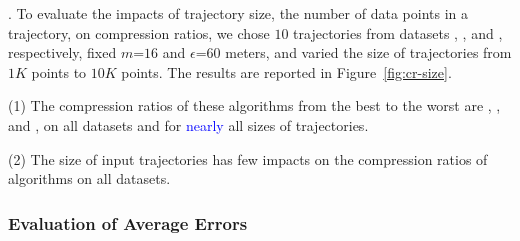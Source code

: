 .
To evaluate the impacts of trajectory size, \ie the number of data points in a trajectory, on compression ratios,
we chose {$10$} trajectories from {datasets \sercar, \geolife, \mopsi and \pricar}, respectively,
fixed {$m$=$16$} and $\epsilon$=$60$ meters, and varied the size  of trajectories from $1K$ points to $10K$ points.
%
The results are reported in Figure~\ref{fig:cr-size}.

\ni(1) The compression ratios of these algorithms from the best to the worst are \cista, \dps, \cist and \squishe, on all datasets and for \textcolor{blue}{nearly} all sizes of trajectories. %

\ni(2) The size of input trajectories has few impacts on the compression ratios of \lsa algorithms on all datasets.





\subsubsection{Evaluation of Average Errors}



